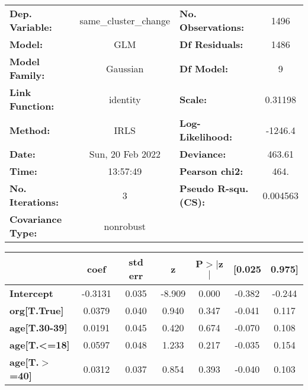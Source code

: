 \begin{center}
\begin{tabular}{lclc}
\toprule
\textbf{Dep. Variable:}            & same\_cluster\_change & \textbf{  No. Observations:  } &     1496    \\
\textbf{Model:}                    &          GLM          & \textbf{  Df Residuals:      } &     1486    \\
\textbf{Model Family:}             &        Gaussian       & \textbf{  Df Model:          } &        9    \\
\textbf{Link Function:}            &        identity       & \textbf{  Scale:             } &   0.31198   \\
\textbf{Method:}                   &          IRLS         & \textbf{  Log-Likelihood:    } &   -1246.4   \\
\textbf{Date:}                     &    Sun, 20 Feb 2022   & \textbf{  Deviance:          } &    463.61   \\
\textbf{Time:}                     &        13:57:49       & \textbf{  Pearson chi2:      } &     464.    \\
\textbf{No. Iterations:}           &           3           & \textbf{  Pseudo R-squ. (CS):} &  0.004563   \\
\textbf{Covariance Type:}          &       nonrobust       & \textbf{                     } &             \\
\bottomrule
\end{tabular}
\begin{tabular}{lcccccc}
                                   & \textbf{coef} & \textbf{std err} & \textbf{z} & \textbf{P$> |$z$|$} & \textbf{[0.025} & \textbf{0.975]}  \\
\midrule
\textbf{Intercept}                 &      -0.3131  &        0.035     &    -8.909  &         0.000        &       -0.382    &       -0.244     \\
\textbf{org[T.True]}               &       0.0379  &        0.040     &     0.940  &         0.347        &       -0.041    &        0.117     \\
\textbf{age[T.30-39]}              &       0.0191  &        0.045     &     0.420  &         0.674        &       -0.070    &        0.108     \\
\textbf{age[T.<=18]}               &       0.0597  &        0.048     &     1.233  &         0.217        &       -0.035    &        0.154     \\
\textbf{age[T.$>$=40]}             &       0.0312  &        0.037     &     0.854  &         0.393        &       -0.040    &        0.103     \\

\end{tabular}
\end{center}

